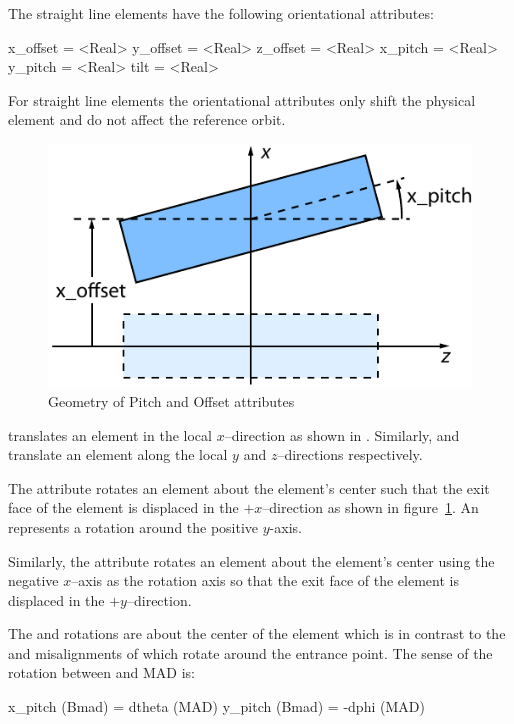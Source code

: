 The straight line elements have the following orientational attributes:
\begin{example}
  x_offset = <Real>
  y_offset = <Real>
  z_offset = <Real>
  x_pitch  = <Real>
  y_pitch  = <Real>
  tilt     = <Real>    
\end{example}
For straight line elements the orientational attributes only shift the
physical element and do not affect the reference orbit.

\begin{figure}[tb]
  \centering
  \includegraphics{pitch.pdf}
  \caption{Geometry of Pitch and Offset attributes}
  \label{f:pitch}
\end{figure}

 translates an element in the local $x$--direction
as shown in . Similarly,  and 
 translate an element along the local $y$ and 
$z$--directions respectively.

The  attribute rotates an element about the element's
center such that the exit face of the element is displaced in the
$+x$--direction as shown in figure~\ref{f:pitch}.  An
 represents a rotation around the positive $y$-axis.

Similarly, the  attribute rotates an element about the
element's center using the negative $x$--axis as the rotation axis so
that the exit face of the element is displaced in the $+y$--direction.

The  and  rotations are about the center of
the element which is in contrast to the  and 
misalignments of \mad which rotate around the entrance point. The
sense of the rotation between \bmad and MAD is:
\begin{example}
  x_pitch (Bmad) =  dtheta (MAD)
  y_pitch (Bmad) = -dphi (MAD)
\end{example}

